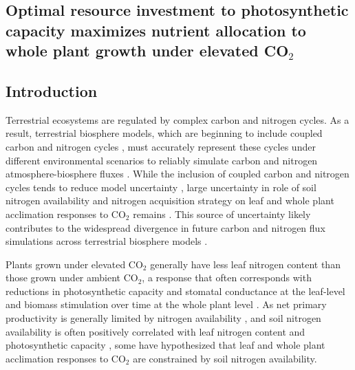 \begin{singlespace}
    \chapter{\textbf{Optimal resource investment to photosynthetic capacity maximizes nutrient allocation to whole plant growth under elevated CO$_2$}}
\end{singlespace}
    
\section{Introduction}
\noindent Terrestrial ecosystems are regulated by complex carbon and nitrogen cycles. As a result, terrestrial biosphere models, which are beginning to include coupled carbon and nitrogen cycles , must accurately represent these cycles under different environmental scenarios to reliably simulate carbon and nitrogen atmosphere-biosphere fluxes . While the inclusion of coupled carbon and nitrogen cycles tends to reduce model uncertainty , large uncertainty in role of soil nitrogen availability and nitrogen acquisition strategy on leaf and whole plant acclimation responses to CO$_2$ remains . This source of uncertainty likely contributes to the widespread divergence in future carbon and nitrogen flux simulations across terrestrial biosphere models .

Plants grown under elevated CO$_2$ generally have less leaf nitrogen content than those grown under ambient CO$_2$, a response that often corresponds with reductions in photosynthetic capacity and stomatal conductance at the leaf-level and biomass stimulation over time at the whole plant level . As net primary productivity is generally limited by nitrogen availability , and soil nitrogen availability is often positively correlated with leaf nitrogen content and photosynthetic capacity , some have hypothesized that leaf and whole plant acclimation responses to CO$_2$ are constrained by soil nitrogen availability. 

